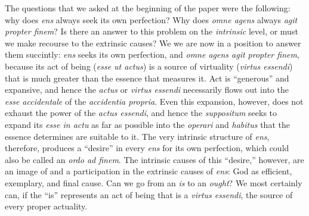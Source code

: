 The questions that we asked at the beginning of the paper were the following: why does \emph{ens} always seek its own perfection? Why does \emph{omne agens} always \emph{agit propter finem}? Is there an answer to this problem on the \emph{intrinsic} level, or must we make recourse to the extrinsic causes? We we are now in a position to answer them succintly: \emph{ens} seeks its own perfection, and \emph{omne agens agit propter finem}, because its act of being (\emph{esse ut actus}) is a source of virtuality (\emph{virtus essendi}) that is much greater than the essence that measures it. Act is “generous” and expansive, and hence the \emph{actus} or \emph{virtus essendi} necessarily flows out into the \emph{esse accidentale} of the \emph{accidentia propria}. Even this expansion, however, does not exhaust the power of the \emph{actus essendi}, and hence the \emph{suppositum} seeks to expand its \emph{esse in actu} as far as possible into the \emph{operari} and \emph{habitus} that the essence determines are suitable to it. The very intrinsic structure of \emph{ens}, therefore, produces a “desire” in every \emph{ens} for its own perfection, which could also be called an \emph{ordo ad finem}. The intrinsic causes of this “desire,” however, are an image of and a participation in the extrinsic causes of \emph{ens}: God as efficient, exemplary, and final cause. Can we go from an \emph{is} to an \emph{ought}? We most certainly can, if the “is” represents an act of being that is a \emph{virtus essendi}, the source of every proper actuality.

